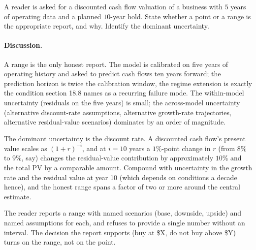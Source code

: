 \begin{exercise}
A reader is asked for a discounted cash flow valuation of a
business with $5$ years of operating data and a planned $10$-year
hold. State whether a point or a range is the appropriate
report, and why. Identify the dominant uncertainty.

\paragraph{Discussion.} A range is the only honest report. The
model is calibrated on five years of operating history and asked to
predict cash flows ten years forward; the prediction horizon is
twice the calibration window, the regime extension is exactly the
condition section 18.8 names as a recurring failure mode. The
within-model uncertainty (residuals on the five years) is small;
the across-model uncertainty (alternative discount-rate
assumptions, alternative growth-rate trajectories, alternative
residual-value scenarios) dominates by an order of magnitude.

The dominant uncertainty is the discount rate. A discounted cash
flow's present value scales as $(1 + r)^{-i}$, and at $i = 10$
years a $1\%$-point change in $r$ (from $8\%$ to $9\%$, say)
changes the residual-value contribution by approximately $10\%$ and
the total PV by a comparable amount. Compound with uncertainty in
the growth rate and the residual value at year 10 (which depends
on conditions a decade hence), and the honest range spans a factor
of two or more around the central estimate.

The reader reports a range with named scenarios (base, downside,
upside) and named assumptions for each, and refuses to provide a
single number without an interval. The decision the report supports
(buy at \$X, do not buy above \$Y) turns on the range, not on the
point.
\end{exercise}

